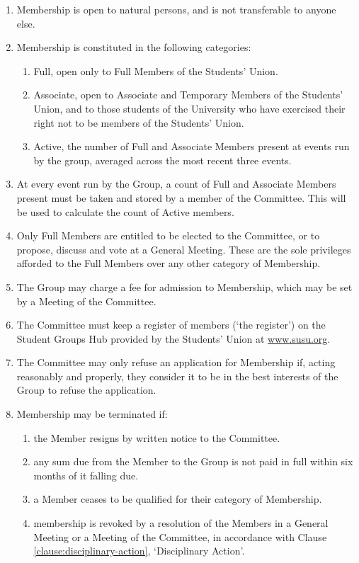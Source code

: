\documentclass[12pt]{constitution}
\begin{document}
\begin{enumerate}
    \item Membership is open to natural persons, and is not transferable to anyone else.
    \item Membership is constituted in the following categories:
    \begin{enumerate}
        \item Full, open only to Full Members of the Students' Union.
        \item Associate, open to Associate and Temporary Members of the Students' Union, and to those students of the University who have exercised their right not to be members of the Students' Union.
        \item Active, the number of Full and Associate Members present at events run by the group, averaged across the most recent three events.
    \end{enumerate}
    \item At every event run by the Group, a count of Full and Associate Members present must be taken and stored by a member of the Committee. This will be used to calculate the count of Active members.
    \item Only Full Members are entitled to be elected to the Committee, or to propose, discuss and vote at a General Meeting. These are the sole privileges afforded to the Full Members over any other category of Membership.
    \item The Group may charge a fee for admission to Membership, which may be set by a Meeting of the Committee.
    \item The Committee must keep a register of members (`the register') on the Student Groups Hub provided by the Students' Union at \url{www.susu.org}.
    \item The Committee may only refuse an application for Membership if, acting reasonably and properly, they consider it to be in the best interests of the Group to refuse the application.
    \item Membership may be terminated if:
    \begin{enumerate}
        \item the Member resigns by written notice to the Committee.
        \item any sum due from the Member to the Group is not paid in full within six months of it falling due.
        \item a Member ceases to be qualified for their category of Membership.
        \item membership is revoked by a resolution of the Members in a General Meeting or a Meeting of the Committee, in accordance with Clause \ref{clause:disciplinary-action}, `Disciplinary Action'.
    \end{enumerate}
\end{enumerate}
\end{document}
